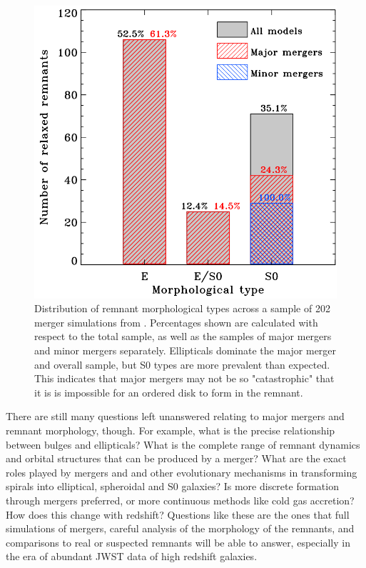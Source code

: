 \documentclass[twocolumn]{aastex631}
\begin{document}
\begin{figure}
    \centering
    \includegraphics[width=0.8\linewidth]{morphs.png}
    \caption{
        Distribution of remnant morphological types across a sample of 202 merger simulations from \cite{Eliche-Moral+2018}.
        Percentages shown are calculated with respect to the total sample, as well as the samples of major mergers and minor mergers separately.
        Ellipticals dominate the major merger and overall sample, but S0 types are more prevalent than expected. 
        This indicates that major mergers may not be so "catastrophic" that it is is impossible for an ordered disk to form in the remnant.
        }
    \label{fig:morphs}
\end{figure}
    
There are still many questions left unanswered relating to major mergers and remnant morphology, though. 
For example, what is the precise relationship between bulges and ellipticals? 
What is the complete range of remnant dynamics and orbital structures that can be produced by a merger? \citep{Barnes+1992}
What are the exact roles played by mergers and and other evolutionary mechanisms in transforming spirals into elliptical, spheroidal and S0 galaxies? \citep{Eliche-Moral+2018}
Is more discrete formation through mergers preferred, or more continuous methods like cold gas accretion? \citep{Lotz+2008}
How does this change with redshift?
Questions like these are the ones that full simulations of mergers, careful analysis of the morphology of the remnants, and comparisons to real or suspected remnants will be able to answer, especially in the era of abundant JWST data of high redshift galaxies.
\end{document}
